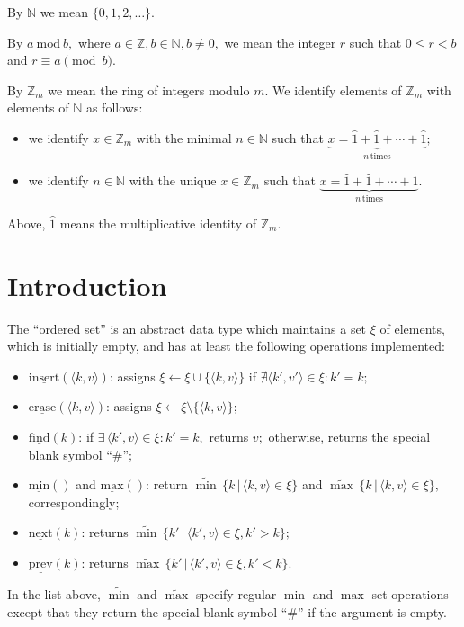 \documentclass[a4paper,12pt]{article}
\newcommand{\Mod}{\ \mathrm{mod}\ }
\begin{document}
By $\mathbb{N}$ we mean $\{ 0, 1, 2, \ldots \}.$

By $a \Mod b,$ where $a \in \mathbb{Z}, b \in \mathbb{N}, b \ne 0,$ we mean the integer $r$ such that $0 \le r < b$ and $r \equiv a \pmod{b}.$

By $\mathbb{Z}_m$ we mean the ring of integers modulo $m.$
We identify elements of $\mathbb{Z}_m$ with elements of $\mathbb{N}$ as follows:
\begin{itemize}
    \item we identify $x \in \mathbb{Z}_m$ with the minimal $n \in \mathbb{N}$ such that
        $\underbrace{x = \hat{1} + \hat{1} + \cdots + \hat{1}}_{n \, \mathrm{times}};$
    \item we identify $n \in \mathbb{N}$ with the unique $x \in \mathbb{Z}_m$ such that
        $\underbrace{x = \hat{1} + \hat{1} + \cdots + \hat{1}}_{n \, \mathrm{times}}.$
\end{itemize}
Above, $\hat{1}$ means the multiplicative identity of $\mathbb{Z}_m.$

\section{Introduction}

The ``ordered set'' is an abstract data type which maintains a set $\xi$ of elements, which is initially empty, and has at least the following operations implemented:
\begin{itemize}
    \item $\underline{\mathrm{insert}}(\langle k, v \rangle)$: assigns $\xi \longleftarrow \xi \cup \{ \langle k, v \rangle \}$ if $\nexists \langle k', v' \rangle \in \xi : k' = k;$
    \item $\underline{\mathrm{erase}}(\langle k, v \rangle)$: assigns $\xi \longleftarrow \xi \setminus \{ \langle k, v \rangle \};$
    \item $\underline{\mathrm{find}}(k)$: if $\exists \, \langle k', v \rangle \in \xi : k' = k,$ returns $v;$ otherwise, returns the special blank symbol ``$\#$'';
    \item $\underline{\mathrm{min}}()$ and $\underline{\mathrm{max}}()$: return
    $\widetilde{\min} \, \{ k \, | \, \langle k, v \rangle \in \xi \}$
    and
    $\widetilde{\max} \, \{ k \, | \, \langle k, v \rangle \in \xi \},$ correspondingly;
    \item $\underline{\mathrm{next}}(k)$: returns $\widetilde{\min} \, \{ k' \, | \, \langle k', v \rangle \in \xi, k' > k \};$
    \item $\underline{\mathrm{prev}}(k)$: returns $\widetilde{\max} \, \{ k' \, | \, \langle k', v \rangle \in \xi, k' < k \}.$
\end{itemize}
In the list above, $\widetilde{\min}$ and $\widetilde{\max}$ specify regular $\min$ and $\max$ set operations except that they return the special blank symbol ``$\#$'' if the argument is empty.
\end{document}
